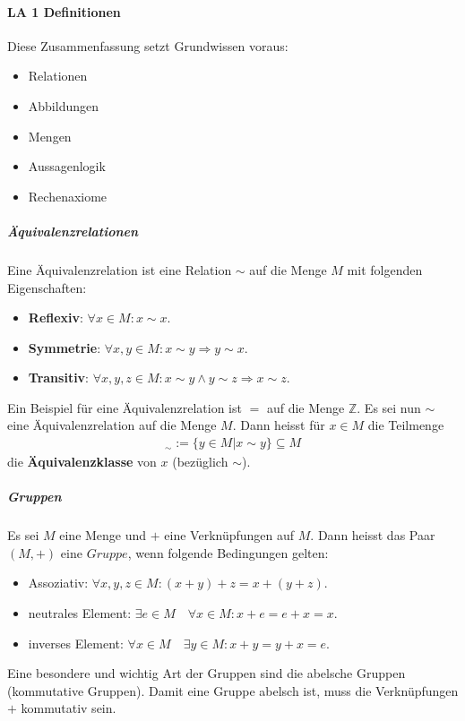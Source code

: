 \documentclass[12pt]{article}
\begin{document}
\paragraph{\Large LA 1 Definitionen}
\begin{flushleft}
    Diese Zusammenfassung setzt Grundwissen voraus:
    \begin{itemize}
        \item Relationen
        \item Abbildungen
        \item Mengen
        \item Aussagenlogik
        \item Rechenaxiome
    \end{itemize}
\end{flushleft}
\vspace{0.5cm}
\subparagraph{\large Äquivalenzrelationen}
\normalsize
\begin{flushleft}
    Eine Äquivalenzrelation ist eine Relation $\sim$ auf die Menge $M$ mit folgenden Eigenschaften:
    \begin{itemize}
        \item \textbf{Reflexiv}: $\forall x \in M: x \sim x$.
        \item \textbf{Symmetrie}: $\forall x,y \in M: x \sim y \Rightarrow y \sim x$.
        \item \textbf{Transitiv}: $\forall x,y,z \in M: x \sim y \land y \sim z \Rightarrow x \sim z$.
    \end{itemize}
    Ein Beispiel für eine Äquivalenzrelation ist $=$ auf die Menge $\mathbb{Z}$.
    \vspace{1cm}
    \linebreak
    Es sei nun $\sim$ eine Äquivalenzrelation auf die Menge $M$. Dann heisst für $x \in M$ die Teilmenge
    \begin{align*}
        [x]_{\sim} := \{y \in M | x \sim y\} \subseteq M
    \end{align*}
    die \textbf{Äquivalenzklasse} von $x$ (bezüglich $\sim$).
\end{flushleft}
\vspace{1cm}
\subparagraph{\large Gruppen}
\normalsize
\begin{flushleft}
    Es sei $M$ eine Menge und $+$ eine Verknüpfungen auf $M$. Dann heisst das Paar $(M,+)$ eine $Gruppe$, wenn folgende Bedingungen gelten:
    \begin{itemize}
        \item Assoziativ: $\forall x,y,z \in M: (x + y) + z = x + (y + z)$.
        \item neutrales Element: $\exists e \in M\quad \forall x \in M: x + e = e + x = x$.
        \item inverses Element: $\forall x \in M\quad \exists y \in M: x + y = y + x = e$.
    \end{itemize}
    Eine besondere und wichtig Art der Gruppen sind die abelsche Gruppen (kommutative Gruppen).
    Damit eine Gruppe abelsch ist, muss die Verknüpfungen $+$ kommutativ sein.
\end{flushleft}
\end{document}
